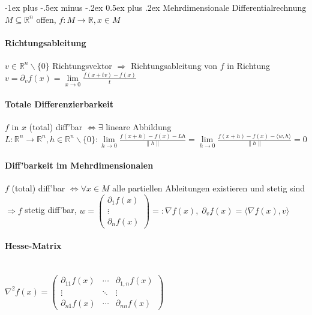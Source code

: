 \documentclass[paper=a3,paper=landscape, fontsize=9pt, DIV=30]{scrartcl}
\makeatletter
\newcommand{\real}{{\mathbb{R}}}
\renewcommand{\section}{\@startsection{section}{1}{0mm}%
  {-1ex plus -.5ex minus -.2ex}%
  {0.5ex plus .2ex}%
  {\color{blue}\normalfont\large\bfseries}}
\makeatother
\begin{document}
\begin{multicols*}{4}
  \section{Mehrdimensionale Differentialrechnung}
	$M \subseteq \real^n$ offen, $f: M \rightarrow \real, x \in M$
	\paragraph{Richtungsableitung}
	$ v \in \real^n \backslash \{0\}$ Richtungsvektor $\Rightarrow$ Richtungsableitung von $f$ in Richtung $v = \partial_vf(x)= \lim\limits_{x \rightarrow 0} \frac{f(x+tv)-f(x)}{t}$

  \paragraph{Totale Differenzierbarkeit}
$f$ in $x$ (total) diff'bar $\Leftrightarrow \exists$ lineare Abbildung $L: \real^n \rightarrow \real^n, h \in \real^n \backslash \{0\}: \lim\limits_{h \rightarrow 0} \frac{f(x+h)-f(x)-Lh}{\lVert h \rVert} = \lim\limits_{h \rightarrow 0} \frac{f(x+h)-f(x)-\langle w,h \rangle}{\lVert h \rVert} = 0$

 \paragraph{Diff'barkeit im Mehrdimensionalen}
 $f$ (total) diff'bar $\Leftrightarrow \forall x \in M$ alle partiellen Ableitungen existieren und stetig sind $\Rightarrow f$ stetig diff'bar, $w=\begin{pmatrix}
 \partial_1f(x)\\\vdots \\ \partial_nf(x)
 \end{pmatrix} =: \nabla f(x),\; \partial_vf(x)=\langle \nabla f(x), v \rangle$

 \paragraph{Hesse-Matrix}\hspace{0pt}\\
  $ \nabla^2f(x) = \begin{pmatrix}
  \partial_{11}f(x)  & \cdots & \partial_{1,n}f(x) \\
  \vdots  & \ddots & \vdots  \\
  \partial_{n1}f(x) & \cdots & \partial_{nn}f(x)
 \end{pmatrix}$


\end{multicols*}
\end{document}
